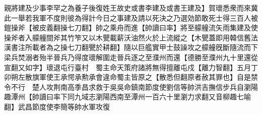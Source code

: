親將建及少事李罕之為養子後復姓王故史或書李建及或書王建及】賀瓌悉衆而來冀此一舉若我軍不度則彼為得計今日之事建及請以死決之乃選効節敢死士得三百人被鎧操斧【被皮義翻操七刀翻】帥之乘舟而進【帥讀曰率】將至艨艟流矢雨集建及使操斧者入艨艟間斧其竹笮又以木甖載薪沃油然火於上流縱之【木甖蓋即用韓信舊法漢書注所載者為之操七刀翻甖於耕翻】隨以巨艦實甲士鼓譟攻之艨艟旣斷隨流而下梁兵焚溺者殆半晉兵乃得度瓌解圍走晉兵逐之至濮州而還【德勝至濮州九十里還從宣翻又如字】瓌退屯行臺村　蜀主命天策府諸將無得擅離屯戍【離力智翻】五月丁卯朔左散旗軍使王承愕承勲承會違命蜀主皆原之【散悉但翻原者赦其罪也】自是禁令不行　楚人攻荆南高季昌求救于吳吳命鎮南節度使劉信等帥洪吉撫信步兵自瀏陽趣潭州【帥讀曰率下同九域志瀏陽西南至潭州一百六十里瀏力求翻又音柳趣七喻翻】武昌節度使李簡等帥水軍攻復